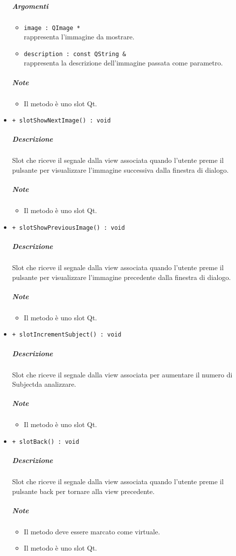 \begin{itemize}
			\color{black}
			\subparagraph{Argomenti}
			\begin{itemize}
				\item \color{RoyalPurple} \verb!image : QImage *!\\				
\color{black} rappresenta l'immagine da mostrare.
				\item \color{RoyalPurple} \verb!description : const QString &!\\				
\color{black} rappresenta la descrizione dell'immagine  passata come parametro.
			\end{itemize}
			\subparagraph{Note}
			\begin{itemize}
				\item Il metodo è uno slot\g{} Qt\g{}.
			\end{itemize}
			\item \color{blue} \verb!+ slotShowNextImage() : void!
			\color{black}
			\subparagraph{Descrizione} Slot\g{} che riceve il segnale dalla view associata quando l'utente preme il pulsante per visualizzare l'immagine successiva dalla finestra di dialogo.
			\subparagraph{Note}
			\begin{itemize}
				\item Il metodo è uno slot\g{} Qt\g{}.
			\end{itemize}
			\item \color{blue} \verb!+ slotShowPreviousImage() : void!
			\color{black}
			\subparagraph{Descrizione} Slot\g{} che riceve il segnale dalla view associata quando l'utente preme il pulsante per visualizzare l'immagine precedente dalla finestra di dialogo.
			\subparagraph{Note}
			\begin{itemize}
				\item Il metodo è uno slot\g{} Qt\g{}.
			\end{itemize}
			\item \color{blue} \verb!+ slotIncrementSubject() : void!
			\color{black}
			\subparagraph{Descrizione} Slot\g{} che riceve il segnale dalla view associata per aumentare il numero di Subject\g{}da analizzare.
			\subparagraph{Note}
			\begin{itemize}
				\item Il metodo è uno slot\g{} Qt\g{}.
			\end{itemize}
			\item \color{blue} \verb!+ slotBack() : void!
			\color{black}
			\subparagraph{Descrizione} Slot\g{} che riceve il segnale dalla view associata quando l'utente preme il pulsante back per tornare alla view precedente.
			\subparagraph{Note}
			\begin{itemize}
				\item Il metodo deve essere marcato come virtuale.
				\item Il metodo è uno slot\g{} Qt\g{}.
			\end{itemize}
		\end{itemize}
